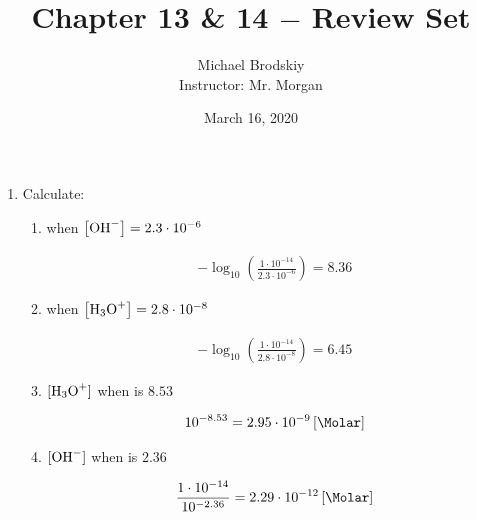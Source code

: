 \documentclass[12pt]{article}
\title{Chapter 13 \& 14 $-$ Review Set}
\date{March 16, 2020}
\author{Michael Brodskiy\\ \small Instructor: Mr. Morgan}
\begin{document}
\maketitle

\begin{enumerate}

  \item Calculate:

    \begin{enumerate}

      \item {} when $\left[ \ce{OH-} \right]=2.3\cdot10^{-6}$

        \begin{equation}
          \begin{split}
            -\log_{10}\left( \frac{1\cdot10^{-14}}{2.3\cdot10^{-6}} \right)=8.36
          \end{split}
          \label{1}
        \end{equation}

      \item {} when $\left[ \ce{H3O+} \right]=2.8\cdot10^{-8}$

        \begin{equation}
          \begin{split}
            -\log_{10}\left( \frac{1\cdot10^{-14}}{2.8\cdot10^{-8}} \right)=6.45
          \end{split}
          \label{2}
        \end{equation}

      \item $[\ce{H3O+}]$ when  is $8.53$

        \begin{equation}
          \begin{split}
            10^{-8.53}=2.95\cdot10^{-9}\left[ \si{\Molar} \right]
          \end{split}
          \label{3}
        \end{equation}

      \item $[\ce{OH-}]$ when  is $2.36$

        \begin{equation}
          \begin{split}
            \frac{1\cdot10^{-14}}{10^{-2.36}}=2.29\cdot10^{-12}\left[ \si{\Molar} \right]
          \end{split}
          \label{4}
        \end{equation}


\end{enumerate}
\end{enumerate}
\end{document}
